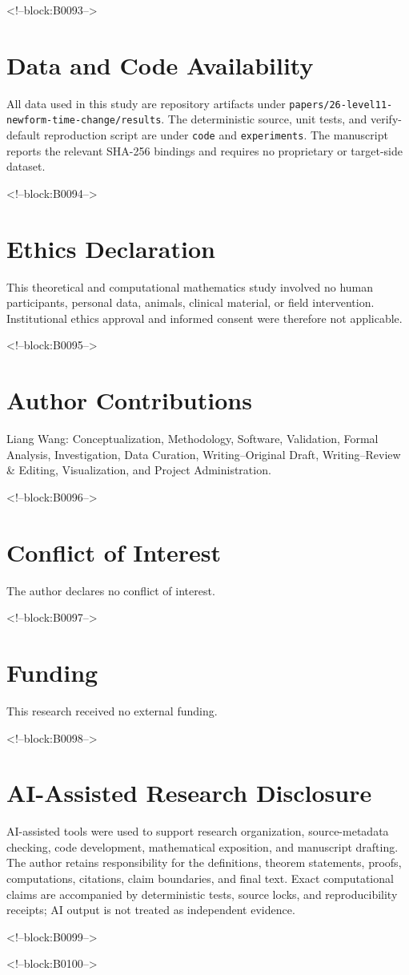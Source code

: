 \documentclass[11pt]{article}
\theoremstyle{definition}
\theoremstyle{remark}
\begin{document}
<!--block:B0093-->
\section*{Data and Code Availability}
All data used in this study are repository artifacts under \texttt{papers/26-level11-newform-time-change/results}. The deterministic source, unit tests, and verify-default reproduction script are under \texttt{code} and \texttt{experiments}. The manuscript reports the relevant SHA-256 bindings and requires no proprietary or target-side dataset.

<!--block:B0094-->
\section*{Ethics Declaration}
This theoretical and computational mathematics study involved no human participants, personal data, animals, clinical material, or field intervention. Institutional ethics approval and informed consent were therefore not applicable.

<!--block:B0095-->
\section*{Author Contributions}
Liang Wang: Conceptualization, Methodology, Software, Validation, Formal Analysis, Investigation, Data Curation, Writing--Original Draft, Writing--Review \& Editing, Visualization, and Project Administration.

<!--block:B0096-->
\section*{Conflict of Interest}
The author declares no conflict of interest.

<!--block:B0097-->
\section*{Funding}
This research received no external funding.

<!--block:B0098-->
\section*{AI-Assisted Research Disclosure}
AI-assisted tools were used to support research organization, source-metadata checking, code development, mathematical exposition, and manuscript drafting. The author retains responsibility for the definitions, theorem statements, proofs, computations, citations, claim boundaries, and final text. Exact computational claims are accompanied by deterministic tests, source locks, and reproducibility receipts; AI output is not treated as independent evidence.

<!--block:B0099-->



<!--block:B0100-->
\end{document}
